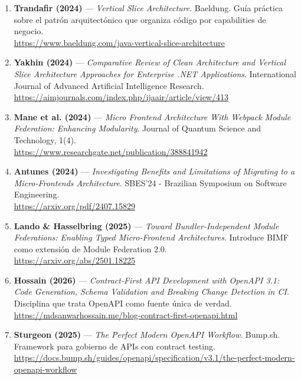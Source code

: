 \documentclass[12pt,a4paper,spanish]{article}
\begin{document}
\begin{enumerate}
\item \textbf{Trandafir (2024)} --- \textit{Vertical Slice Architecture}. Baeldung. Guía práctica sobre el patrón arquitectónico que organiza código por capabilities de negocio.\\
\url{https://www.baeldung.com/java-vertical-slice-architecture}

\item \textbf{Yakhin (2024)} --- \textit{Comparative Review of Clean Architecture and Vertical Slice Architecture Approaches for Enterprise .NET Applications}. International Journal of Advanced Artificial Intelligence Research.\\
\url{https://aimjournals.com/index.php/ijaair/article/view/413}

\item \textbf{Mane et al. (2024)} --- \textit{Micro Frontend Architecture With Webpack Module Federation: Enhancing Modularity}. Journal of Quantum Science and Technology, 1(4).\\
\url{https://www.researchgate.net/publication/388841942}

\item \textbf{Antunes (2024)} --- \textit{Investigating Benefits and Limitations of Migrating to a Micro-Frontends Architecture}. SBES'24 - Brazilian Symposium on Software Engineering.\\
\url{https://arxiv.org/pdf/2407.15829}

\item \textbf{Lando \& Hasselbring (2025)} --- \textit{Toward Bundler-Independent Module Federations: Enabling Typed Micro-Frontend Architectures}. Introduce BIMF como extensión de Module Federation 2.0.\\
\url{https://arxiv.org/abs/2501.18225}

\item \textbf{Hossain (2026)} --- \textit{Contract-First API Development with OpenAPI 3.1: Code Generation, Schema Validation and Breaking Change Detection in CI}. Disciplina que trata OpenAPI como fuente única de verdad.\\
\url{https://mdsanwarhossain.me/blog-contract-first-openapi.html}

\item \textbf{Sturgeon (2025)} --- \textit{The Perfect Modern OpenAPI Workflow}. Bump.sh. Framework para gobierno de APIs con contract testing.\\
\url{https://docs.bump.sh/guides/openapi/specification/v3.1/the-perfect-modern-openapi-workflow}


\end{enumerate}
\end{document}
